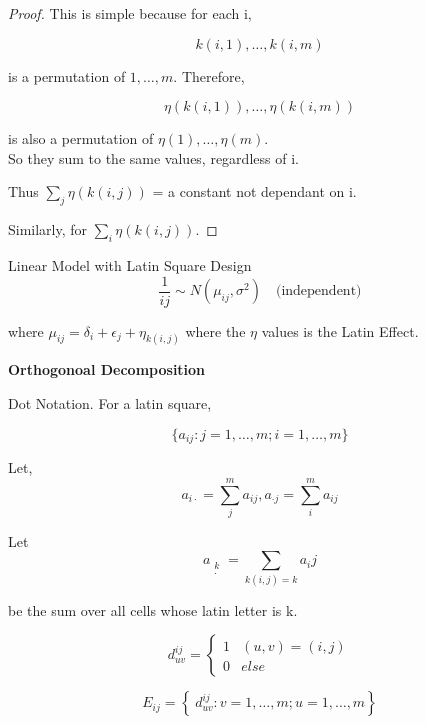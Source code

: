 \documentclass[11pt,fleqn]{book} %
\begin{document}
\begin{proof}
	This is simple because for each i, 

			$$ k(i, 1), \dots, k(i,m)$$

	is a permutation of $1, \dots, m$. Therefore, 

			$$\eta(k(i,1)), \dots, \eta(k(i,m)) $$

	is also a permutation of $\eta(1), \dots, \eta(m)$.\\

	So they sum to the same values, regardless of i. 

	Thus $\sum_j \eta(k(i,j))$ = a constant not dependant on i.

	Similarly, for $\sum_i \eta(k(i,j))$.

\end{proof}


Linear Model with Latin Square Design\\

		$$ \frac{1}{ij} \sim N(\mu_{ij}, \sigma^2) \quad \text{(independent)}$$

where $\mu_{ij} = \delta_i + \epsilon_j + \eta_{k(i,j)} $ where the $\eta$ values is the Latin Effect.


\textbf{Orthogonoal Decomposition}\\


\begin{notation}
	Dot Notation. For a latin square, 

			$$\{a_{ij}: j = 1, \dots, m; i = 1, \dots, m \} $$
 
 Let, 
			$$a_{i \cdot} = \sum_j^m a_{ij}, a_{ \cdot j} = \sum_i^m a_{ij}$$

Let 
			$$ a_{\begin{matrix}
				k\\
				\cdot
			\end{matrix}} = \sum_{k(i,j) = k} a_ij$$

	be the sum over all cells whose latin letter is k. 
\end{notation}


\begin{notation}
			$$d^{ij}_{uv} = \left\{ \begin{array}{ll}
										1 &  (u,v) = (i, j)\\
										0 & else
									\end{array} \right.$$

			$$E_{ij} = \left\{\ d^{ij}_{uv}: v = 1, \dots, m; u = 1, \dots, m \right\} $$


								
\end{notation}
\end{document}
